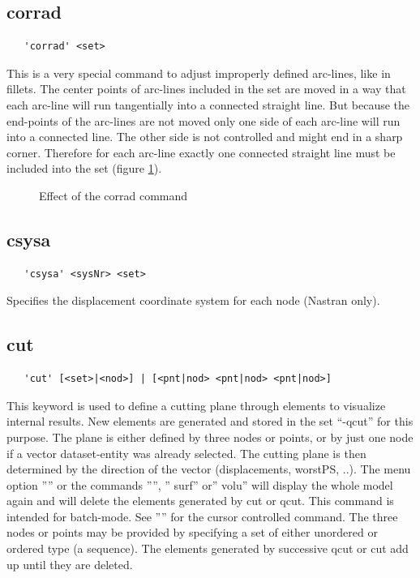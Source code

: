 \documentclass{article}
\begin{document}
\subsection{\label{corrad}corrad}
\begin{verbatim}
   'corrad' <set>
\end{verbatim}
This is a very special command to adjust improperly defined arc-lines, like in fillets. The center points of arc-lines included in the set are moved in a way that each arc-line will run tangentially into a connected straight line. But because the end-points of the arc-lines are not moved only one side of each arc-line will run into a connected line. The other side is not controlled and might end in a sharp corner. Therefore for each arc-line exactly one connected straight line must be included into the set (figure \ref{corradp}).

\begin{figure}[h]
\caption{\label{corradp} Effect of the corrad command }
\end{figure}

\subsection{\label{csysa}csysa}
\begin{verbatim}
   'csysa' <sysNr> <set>                                                               
\end{verbatim}
Specifies the displacement coordinate system for each node (Nastran only).

\subsection{\label{cut}cut}
\begin{verbatim}
   'cut' [<set>|<nod>] | [<pnt|nod> <pnt|nod> <pnt|nod>]
\end{verbatim}
This keyword is used to define a cutting plane through elements to visualize internal results. New elements are generated and stored in the set ``-qcut'' for this purpose. The plane is either defined by three nodes or points, or by just one node if a vector dataset-entity was already selected. The cutting plane is then determined by the direction of the vector (displacements, worstPS, ..). The menu option '''' or the commands '''', '' surf'' or'' volu'' will display the whole model again and will delete the elements generated by cut or qcut. This command is intended for batch-mode. See '''' for the cursor controlled command. The three nodes or points may be provided by specifying a set of either unordered or ordered type (a sequence). The elements generated by successive qcut or cut add up until they are deleted.
\end{document}
